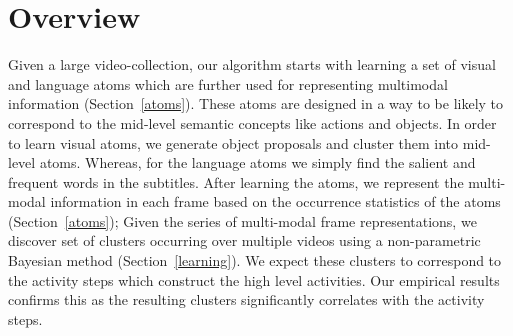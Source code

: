 \section{Overview}
\label{sec:overview}


Given a large video-collection, our algorithm starts with learning a set of visual and language atoms which are further used for representing multimodal information (Section~\ref{atoms}). These atoms are designed in a way to be likely to correspond to the mid-level semantic concepts like actions and objects. In order to learn visual atoms, we generate object proposals and cluster them into mid-level atoms. Whereas, for the language atoms we simply find the salient and frequent words in the subtitles. After learning the atoms, we represent the multi-modal information in each frame based on the occurrence statistics of the atoms (Section~\ref{atoms}); Given the series of multi-modal frame representations, we discover set of clusters occurring over multiple videos using a non-parametric Bayesian method (Section~\ref{learning}). We expect these clusters to correspond to the activity steps which construct the high level activities. Our empirical results confirms this as the resulting clusters significantly correlates with the activity steps.




